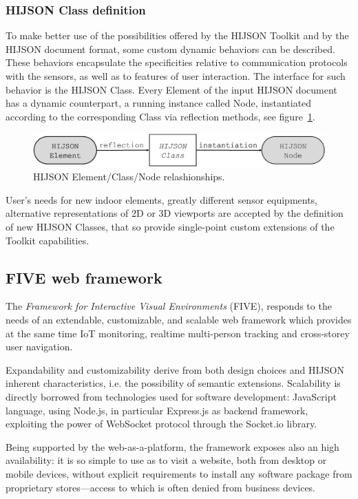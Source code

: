 \documentclass[]{egpubl}
\begin{document}
\subsubsection{HIJSON Class definition}

To make better use of the possibilities offered by the HIJSON Toolkit and by
the HIJSON document format, some custom dynamic behaviors can be described.
These behaviors encapsulate the specificities relative to communication
protocols with the sensors, as well as to features of user interaction. The
interface for such behavior is the HIJSON Class. Every Element of the input
HIJSON document has a dynamic counterpart, a running instance called  Node,
instantiated according to the corresponding Class via reflection methods, see figure~\ref{fig:el-class-node}.

\begin{figure}[h]
 \centering
 \includegraphics[width=0.6\linewidth]{images/element-class-node}
 \caption{HIJSON Element/Class/Node relashionships.}
 \label{fig:el-class-node}
\end{figure}

User's needs for new indoor elements, greatly different sensor equipments,
alternative representations of 2D or 3D viewports are accepted by the
definition of new HIJSON Classes, that so provide single-point custom
extensions of the Toolkit capabilities.

\subsection{FIVE web framework}

The  \emph{Framework for Interactive Visual Environments} (FIVE), responds to the needs of an extendable, customizable,
and scalable web framework which provides at the same time IoT monitoring,
realtime multi-person tracking and cross-storey user navigation.

Expandability and customizability derive from both design choices and HIJSON
inherent characteristics, i.e. the possibility of semantic extensions.
Scalability is directly borrowed from technologies used for software
development: JavaScript language, using Node.js, in particular Express.js as
backend framework, exploiting the power of WebSocket protocol through the
Socket.io library.

Being supported by the web-as-a-platform, the framework exposes also an high
availability: it is so simple to use as to visit a website, both from desktop
or mobile devices, without explicit requirements to install any software
package from proprietary stores---access to which is often denied from business
devices.
\end{document}
